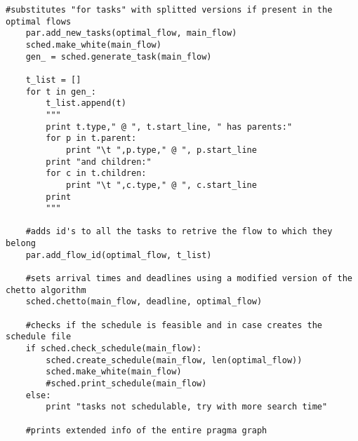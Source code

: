 \documentclass[a4paper,10pt,twoside]{book}
\begin{document}
\begin{lstlisting}[language=CCC, caption=graphCreator.py]
	#substitutes "for tasks" with splitted versions if present in the optimal flows
	par.add_new_tasks(optimal_flow, main_flow)
	sched.make_white(main_flow)
	gen_ = sched.generate_task(main_flow)

	t_list = []
	for t in gen_:
		t_list.append(t)
		"""
		print t.type," @ ", t.start_line, " has parents:"
		for p in t.parent:
			print "\t ",p.type," @ ", p.start_line
		print "and children:"
		for c in t.children:
			print "\t ",c.type," @ ", c.start_line
		print
		"""

	#adds id's to all the tasks to retrive the flow to which they belong
	par.add_flow_id(optimal_flow, t_list)

	#sets arrival times and deadlines using a modified version of the chetto algorithm
	sched.chetto(main_flow, deadline, optimal_flow)

	#checks if the schedule is feasible and in case creates the schedule file
	if sched.check_schedule(main_flow):
		sched.create_schedule(main_flow, len(optimal_flow))
		sched.make_white(main_flow)
		#sched.print_schedule(main_flow)
	else:
		print "tasks not schedulable, try with more search time"

	#prints extended info of the entire pragma graph
\end{lstlisting}
\end{document}
